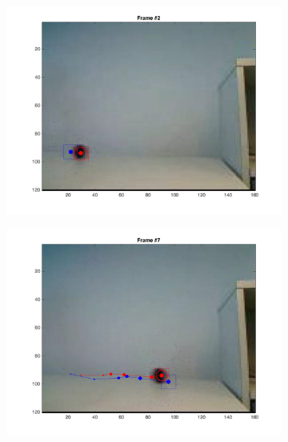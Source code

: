 \documentclass{ethz_report}
\begin{document}
\begin{figure}[h]
    \centering
    \begin{subfigure}[b]{.25\textwidth}
        \centering
        \includegraphics[width=1\linewidth]{images/video3_model_1}
    \end{subfigure}%
    \begin{subfigure}[b]{.25\textwidth}
        \centering
        \includegraphics[width=1\linewidth]{images/video3_model_6}
    \end{subfigure}%
    \begin{subfigure}[b]{.25\textwidth}
        \centering

\end{subfigure}
\end{figure}
\end{document}
